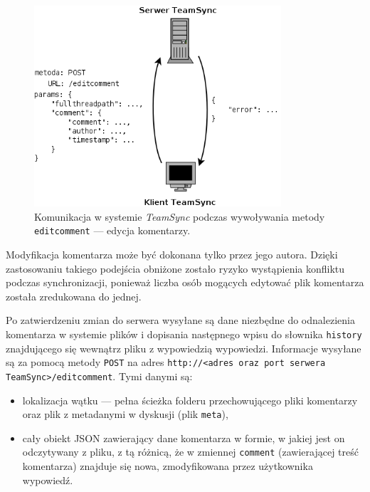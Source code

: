 \documentclass[polish,a4paper,twoside]{ppfcmthesis}
\begin{document}
\begin{figure}[h!]
  \vspace{5pt}
  \begin{center}
    \includegraphics[width=260pt]{figures/meteditcomment.png}
  \end{center}
  \caption{Komunikacja w systemie \emph{TeamSync} podczas wywoływania metody \texttt{editcomment} --- edycja komentarzy.}
  \label{picmetdeletefolder}
\end{figure}

Modyfikacja komentarza może być dokonana tylko przez jego autora. Dzięki zastosowaniu takiego podejścia obniżone zostało ryzyko wystąpienia konfliktu podczas synchronizacji, ponieważ liczba osób mogących edytować plik komentarza została zredukowana do jednej.

Po zatwierdzeniu zmian do serwera wysyłane są dane niezbędne do odnalezienia komentarza w systemie plików i dopisania następnego wpisu do słownika \texttt{history} znajdującego się wewnątrz pliku z wypowiedzią wypowiedzi. Informacje wysyłane są za pomocą metody \texttt{POST} na adres \texttt{http://<adres oraz port\- serwera TeamSync>/\-editcomment}. Tymi danymi są:

\begin{itemize}[noitemsep]
  \item lokalizacja wątku --- pełna ścieżka folderu przechowującego pliki komentarzy oraz plik z metadanymi w dyskusji (plik \texttt{meta}),
  
  \item cały obiekt JSON zawierający dane komentarza w formie, w jakiej jest on odczytywany z pliku, z tą różnicą, że w zmiennej \texttt{comment} (zawierającej treść komentarza) znajduje się nowa, zmodyfikowana przez użytkownika wypowiedź.
\end{itemize}
\end{document}
